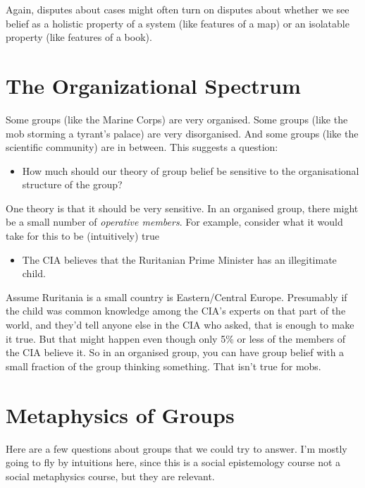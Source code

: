 Again, disputes about cases might often turn on disputes about whether we see belief as a holistic property of a system (like features of a map) or an isolatable property (like features of a book).

\section{The Organizational Spectrum}
\label{theorganizationalspectrum}

Some groups (like the Marine Corps) are very organised. Some groups (like the mob storming a tyrant's palace) are very disorganised. And some groups (like the scientific community) are in between. This suggests a question:

\begin{itemize}
\item{} How much should our theory of group belief be sensitive to the organisational structure of the group?

\end{itemize}
One theory is that it should be very sensitive. In an organised group, there might be a small number of \emph{operative members}. For example, consider what it would take for this to be (intuitively) true

\begin{itemize}
\item{} The CIA believes that the Ruritanian Prime Minister has an illegitimate child.

\end{itemize}
Assume Ruritania is a small country is Eastern\slash Central Europe. Presumably if the child was common knowledge among the CIA's experts on that part of the world, and they'd tell anyone else in the CIA who asked, that is enough to make it true. But that might happen even though only 5\% or less of the members of the CIA believe it. So in an organised group, you can have group belief with a small fraction of the group thinking something. That isn't true for mobs.

\section{Metaphysics of Groups}
\label{metaphysicsofgroups}

Here are a few questions about groups that we could try to answer. I'm mostly going to fly by intuitions here, since this is a social epistemology course not a social metaphysics course, but they are relevant.


